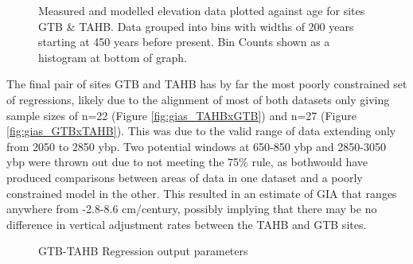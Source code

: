 \begin{figure}[H]
	\caption{Measured and modelled elevation data plotted against age for sites GTB \& TAHB. Data grouped into bins with widths of 200 years starting at 450 years before present. Bin Counts shown as a histogram at bottom of graph.}	
	\label{fig:data_GTBxTAHB}
\end{figure}
The final pair of sites GTB and TAHB has by far the most poorly constrained set
of regressions, likely due to the alignment of most of both datasets only giving
sample sizes of n=22 (Figure \ref{fig:gias_TAHBxGTB}) and n=27 (Figure \ref{fig:gias_GTBxTAHB}).
This was due to the valid range of data extending only from 2050 to 2850 ybp. Two
potential windows at 650-850 ybp and 2850-3050 ybp were thrown out due to not
meeting the 75\% rule, as bothwould have produced comparisons between areas of
data in one dataset and a poorly constrained model in the other.
This resulted in an estimate of GIA that ranges anywhere from -2.8-8.6 cm/century,
possibly implying that there may be no difference in vertical adjustment rates
between the TAHB and GTB sites. \\

\begin{figure}[H]
	\begin{flushleft}
	\end{flushleft}
	\caption{GTB-TAHB Regression output parameters}
	\label{fig:GTBxTAHB_regression}
\end{figure}

